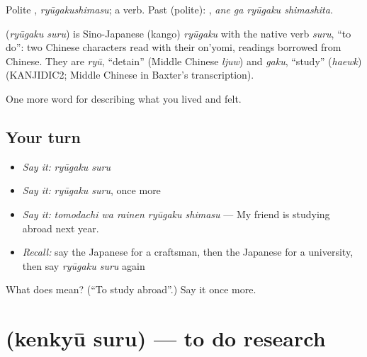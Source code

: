 Polite \textbf{}, \emph{ryūgakushimasu}; a  verb. Past (polite): \textbf{ }, \emph{ane ga ryūgaku shimashita}.

\begin{cousinweb}
\textbf{} (\emph{ryūgaku suru}) is Sino-Japanese (kango) \emph{ryūgaku} with the native verb \emph{suru}, \textquotedblleft{}to do\textquotedblright{}: two Chinese characters read with their on'yomi, readings borrowed from Chinese. They are \emph{ryū}, \textquotedblleft{}detain\textquotedblright{} (Middle Chinese \emph{ljuw}) and \emph{gaku}, \textquotedblleft{}study\textquotedblright{} (\emph{haewk}) (KANJIDIC2; Middle Chinese in Baxter's transcription).
\end{cousinweb}

\begin{grammarlens}[title={What you've built}]
One more word for describing what you lived and felt.
\end{grammarlens}

\subsection*{Your turn}
\begin{itemize}
\raggedright
  \item \emph{Say it:} \emph{ryūgaku suru}
  \item \emph{Say it:} \emph{ryūgaku suru}, once more
  \item \emph{Say it:} \emph{tomodachi wa rainen ryūgaku shimasu} — My friend is studying abroad next year.
  \item \emph{Recall:} say the Japanese for a craftsman, then the Japanese for a university, then say \emph{ryūgaku suru} again
\end{itemize}

\begin{tcolorbox}[breakable,colback=teal!4,colframe=teal!35!black,title={Before you move on}]
What does  mean? (\textquotedblleft{}To study abroad\textquotedblright{}.) Say it once more.
\end{tcolorbox}
\section[\texorpdfstring{\ja{けんきゅうする} (kenkyū suru)}{けんきゅうする (kenkyū suru)}]{ (kenkyū suru) — to do research}

\label{lesson:JA-C459-kenkyuu-suru}



